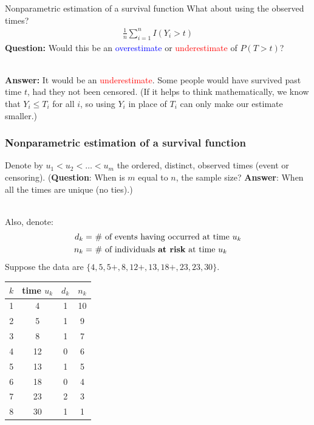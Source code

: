 \documentclass[10pt,t]{beamer}
\begin{document}
\begin{frame}{Nonparametric estimation of a survival function}
	What about using the observed times?
	\begin{align*}
		\frac{1}{n}\sum_{i=1}^{n}I(Y_i > t)
	\end{align*}
	\textbf{Question:} Would this be an \textcolor{blue}{overestimate} or \textcolor{red}{underestimate} of $P(T > t)$? \pause 
	\\ ~\ 
	
	\textbf{Answer:} It would be an \textcolor{red}{underestimate}. Some people would have survived past time $t$, had they not been censored. (If it helps to think mathematically, we know that $Y_i \leq T_i$ for all $i$, so using $Y_i$ in place of $T_i$ can only make our estimate smaller.)
\end{frame}

\begin{frame}
\frametitle{Nonparametric estimation of a survival function}
\vspace{-0.8cm}
Denote by $u_1 < u_2 < \dots < u_m$ the ordered, distinct, observed times (event or censoring). (\textbf{Question}: When is $m$ equal to $n$, the sample size? \pause \textbf{Answer}: When all the times are unique (no ties).)\pause 
\\ ~\

Also, denote: 
\begin{align*}
d_k = & \ \text{\# of events having occurred at time $u_k$} \\
n_k = & \ \text{\# of individuals \textbf{at risk} at time $u_k$}
\end{align*}
Suppose the data are $\{4, 5, 5+, 8, 12+, 13, 18+, 23, 23, 30\}$.\pause 

\begin{center}
\begin{tabular}{|c|c|c|c|}
\hline
$k$ & time $u_k$ & $d_k$ & $n_k$ \\
\hline
1 & 4 & 1 & 10 \\
2& 5 & 1 & 9 \\
3& 8 & 1 & 7 \\
4&12 & 0 & 6 \\
5&13 & 1 & 5 \\
6&18 & 0 & 4 \\
7&23 & 2 & 3 \\
8&30 & 1 & 1 \\
\hline
\end{tabular}
\end{center}
\end{frame}
\end{document}
